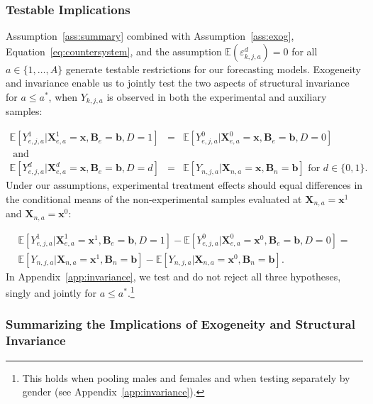 \subsubsection{Testable Implications}

Assumption~\ref{ass:summary} combined with Assumption~\ref{ass:exog}, Equation~\eqref{eq:countersystem}, and the assumption $\mathbb{E}(\varepsilon^d_{k,j,a})=0$ for all $a \in \{1,\dots,A\}$ generate testable restrictions for our forecasting models. Exogeneity and invariance enable us to jointly test the two aspects of structural invariance for $a \leq a^*$, when $Y_{k,j,a}$ is observed in both the experimental and auxiliary samples:

\begin{eqnarray}
\mathbb{E} \left[ Y_{e,j,a}^1 | \bm{X}_{e,a}^1 = \bm{x}, \bm{B}_{e} = \bm{b}, D = 1   \right] &=&  \mathbb{E} \left[ Y_{e,j,a}^0 | \bm{X}_{e,a}^0 = \bm{x}, \bm{B}_{e} = \bm{b}, D = 0   \right]  \\
\text{ and} & \nonumber \\
\mathbb{E} \left[ Y_{e,j,a}^d | \bm{X}_{e,a}^d = \bm{x}, \bm{B}_{e} = \bm{b}, D = d   \right] &=&  \mathbb{E} \left[ Y_{n,j,a} | \bm{X}_{n,a} = \bm{x}, \bm{B}_{n} = \bm{b} \right] \text{ for }  d \in \{0,1\}.
\end{eqnarray}
Under our assumptions, experimental treatment effects should equal differences in the conditional means of the non-experimental samples evaluated at $\bm{X}_{n,a} = \bm{x}^1$ and  $\bm{X}_{n,a} = \bm{x}^0$:

\begin{eqnarray}
\mathbb{E} \left[ Y_{e,j,a}^1 |  \bm{X}_{e,a}^1 = \bm{x}^1, \bm{B}_e = \bm{b}, D = 1 \right] - \mathbb{E} \left[ Y_{e,j,a}^0 |  \bm{X}_{e,a}^0 = \bm{x}^0, \bm{B}_e = \bm{b}, D = 0 \right] = \nonumber \\
\mathbb{E} \left[ Y_{n,j,a} | \bm{X}_{n,a} = \bm{x}^1, \bm{B}_n = \bm{b} \right] - \mathbb{E} \left[ Y_{n,j,a} | \bm{X}_{n,a} = \bm{x}^0, \bm{B}_n = \bm{b} \right].
\end{eqnarray}
In Appendix~\ref{app:invariance}, we test and do not reject all three hypotheses, singly and jointly for $a\leq a^*$.\footnote{This holds when pooling males and females and when testing separately by gender (see  Appendix~\ref{app:invariance}).}

\subsubsection{Summarizing the Implications of Exogeneity and Structural Invariance}

